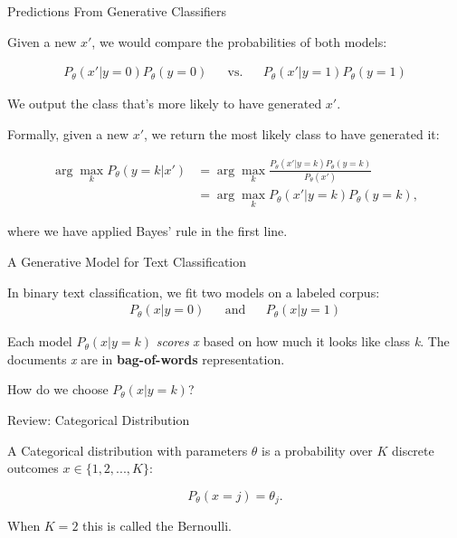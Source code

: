 \documentclass[../../main.tex]{subfiles}
\begin{document}
\begin{frame}[fragile]{Predictions From Generative Classifiers}


Given a new $x'$, we would compare the probabilities of both models:

\begin{align*}
P_\theta(x'|y=\text{0})P_\theta(y=\text{0}) && \text{vs.} && P_\theta(x'|y=\text{1})P_\theta(y=\text{1})
\end{align*}

We output the class that's more likely to have generated $x'$.


Formally, given a new $x'$, we return the most likely class to have generated it:

\begin{align*}
\arg \max_k P_\theta(y=k | x') & = \arg \max_k  \frac{P_\theta(x' | y=k) P_\theta(y=k)}{P_\theta(x')} \\
& = \arg \max_k P_\theta(x' | y=k) P_\theta(y=k),
\end{align*}

where we have applied Bayes' rule in the first line.

\end{frame}

\begin{frame}[fragile]{A Generative Model for Text Classification}


In binary text classification, we fit two models on a labeled corpus:
\begin{align*}
P_\theta(x|y=\text{0}) && \text{and} && P_\theta(x|y=\text{1})
\end{align*}


Each model $P_\theta(x | y=k)$ \textit{scores} \textit{x} based on how much it looks like class \textit{k}.
The documents \textit{x} are in \textbf{bag-of-words} representation.

\vspace{0.2cm}

How do we choose $P_\theta(x|y=k)$?
\end{frame}

\begin{frame}[fragile]{Review: Categorical Distribution}


A Categorical distribution with parameters $\theta$ is a probability
over $K$ discrete outcomes $x \in \{1,2,...,K\}$:

$$
P_\theta(x = j) = \theta_j.
$$

When $K=2$ this is called the Bernoulli.



\end{frame}
\end{document}
